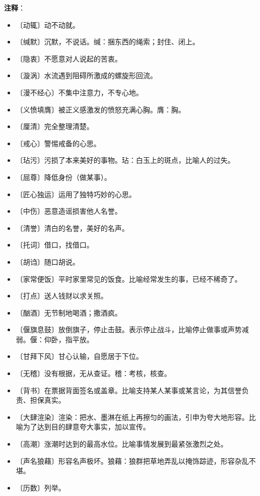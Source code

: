 \documentclass[12pt,UTF-8,openany]{ctexbook}
\begin{document}
\newpage

\textbf{注释}：

\vspace{-1em}

\begin{itemize}
    \setlength\itemsep{-0.2em}
    \item 〔动辄〕动不动就。
    \item 〔缄默〕沉默，不说话。缄：捆东西的绳索；封住、闭上。
    \item 〔隐衷〕不愿意对人说起的苦衷。
    \item 〔漩涡〕水流遇到阻碍所激成的螺旋形回流。
    \item 〔漫不经心〕不集中注意力，不专心地。
    \item 〔义愤填膺〕被正义感激发的愤怒充满心胸。膺：胸。
    \item 〔厘清〕完全整理清楚。
    \item 〔戒心〕警惕戒备的心思。
    \item 〔玷污〕污损了本来美好的事物。玷：白玉上的斑点，比喻人的过失。
    \item 〔屈尊〕降低身份（做某事）。
    \item 〔匠心独运〕运用了独特巧妙的心思。
    \item 〔中伤〕恶意造谣损害他人名誉。
    \item 〔清誉〕清白的名誉，美好的名声。
    \item 〔托词〕借口，找借口。
    \item 〔胡诌〕随口胡说。
    \item 〔家常便饭〕平时家里常见的饭食。比喻经常发生的事，已经不稀奇了。
    \item 〔打点〕送人钱财以求关照。
    \item 〔酗酒〕无节制地喝酒；撒酒疯。
    \item 〔偃旗息鼓〕放倒旗子，停止击鼓。表示停止战斗，比喻停止做事或声势减弱。偃：仰卧，指平放。
    \item 〔甘拜下风〕甘心认输，自愿居于下位。
    \item 〔无稽〕没有根据，无从查证。稽：考核，核查。
    \item 〔背书〕在票据背面签名或盖章。比喻支持某人某事或某言论，为其信誉负责、担保真实。
    \item 〔大肆渲染〕渲染：把水、墨淋在纸上再擦匀的画法，引申为夸大地形容。比喻为了达到目的肆意夸大事实，加以宣传。
    \item 〔高潮〕涨潮时达到的最高水位。比喻事情发展到最紧张激烈之处。
    \item 〔声名狼藉〕形容名声极坏。狼藉：狼群把草地弄乱以掩饰踪迹，形容杂乱不堪。
    \item 〔历数〕列举。
\end{itemize}
\end{document}
